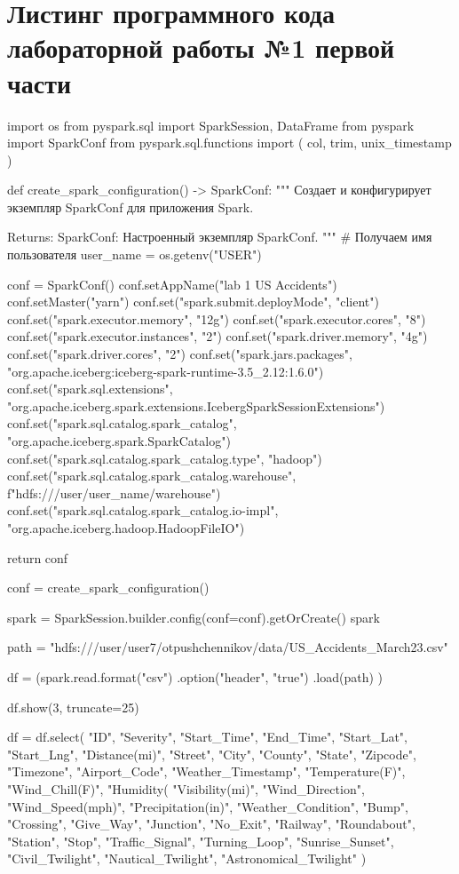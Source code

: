 %
\chapter{Листинг программного кода лабораторной работы №1 первой части}\label{app:A}\vspace{\baselineskip}


\begin{code}
import os
from pyspark.sql import SparkSession, DataFrame
from pyspark import SparkConf
from pyspark.sql.functions import (
    col,
    trim,
    unix_timestamp
)

def create_spark_configuration() -> SparkConf:
    """
    Создает и конфигурирует экземпляр SparkConf для приложения Spark.

    Returns:
        SparkConf: Настроенный экземпляр SparkConf.
    """
    # Получаем имя пользователя
    user_name = os.getenv("USER")
    
    conf = SparkConf()
    conf.setAppName("lab 1 US Accidents")
    conf.setMaster("yarn")
    conf.set("spark.submit.deployMode", "client")
    conf.set("spark.executor.memory", "12g")
    conf.set("spark.executor.cores", "8")
    conf.set("spark.executor.instances", "2")
    conf.set("spark.driver.memory", "4g")
    conf.set("spark.driver.cores", "2")
    conf.set("spark.jars.packages", "org.apache.iceberg:iceberg-spark-runtime-3.5_2.12:1.6.0")
    conf.set("spark.sql.extensions", "org.apache.iceberg.spark.extensions.IcebergSparkSessionExtensions")
    conf.set("spark.sql.catalog.spark_catalog", "org.apache.iceberg.spark.SparkCatalog")
    conf.set("spark.sql.catalog.spark_catalog.type", "hadoop")
    conf.set("spark.sql.catalog.spark_catalog.warehouse", f"hdfs:///user/{user_name}/warehouse")
    conf.set("spark.sql.catalog.spark_catalog.io-impl", "org.apache.iceberg.hadoop.HadoopFileIO")

    return conf

conf = create_spark_configuration()

spark = SparkSession.builder.config(conf=conf).getOrCreate()
spark

path = "hdfs:///user/user7/otpushchennikov/data/US_Accidents_March23.csv"

df = (spark.read.format("csv")
      .option("header", "true")
      .load(path)
)

df.show(3, truncate=25)

df = df.select(
    "ID", "Severity", "Start_Time", "End_Time", "Start_Lat", "Start_Lng", "Distance(mi)",
    "Street", "City", "County", "State", "Zipcode", "Timezone", "Airport_Code",
    "Weather_Timestamp", "Temperature(F)", "Wind_Chill(F)", "Humidity(%
    "Visibility(mi)", "Wind_Direction", "Wind_Speed(mph)", "Precipitation(in)",
    "Weather_Condition", "Bump", "Crossing", "Give_Way", "Junction", "No_Exit", "Railway",
    "Roundabout", "Station", "Stop", "Traffic_Signal", "Turning_Loop", "Sunrise_Sunset",
    "Civil_Twilight", "Nautical_Twilight", "Astronomical_Twilight"
)


\end{code}

